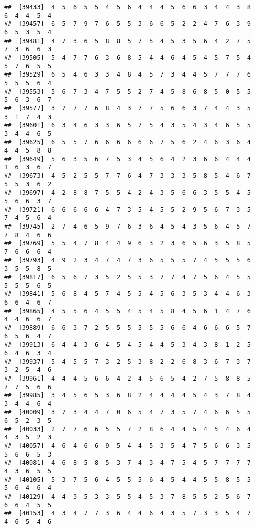 \documentclass[
]{book}
\begin{document}
\begin{verbatim}
##  [39433]  4  5  6  5  5  4  5  6  4  4  4  5  6  6  3  4  4  3  8  6  4  4  5  4
##  [39457]  6  5  7  9  7  6  5  5  3  6  6  5  2  2  4  7  6  3  9  6  5  3  5  4
##  [39481]  4  7  3  6  5  8  8  5  7  5  4  5  3  5  6  4  2  7  5  7  3  6  6  3
##  [39505]  5  4  7  7  6  3  6  8  5  4  4  6  4  5  4  5  7  5  4  5  7  6  5  5
##  [39529]  6  5  4  6  3  3  4  8  4  5  7  3  4  4  5  7  7  7  6  5  5  5  6  4
##  [39553]  5  6  7  3  4  7  5  5  2  7  4  5  8  6  8  5  0  5  5  5  6  3  6  7
##  [39577]  3  7  7  7  6  8  4  3  7  7  5  6  6  3  7  4  4  3  5  3  1  7  4  3
##  [39601]  6  3  4  6  3  3  6  5  7  5  4  3  5  4  3  4  6  5  5  3  4  4  6  5
##  [39625]  6  5  5  7  6  6  6  6  6  6  7  5  6  2  4  6  3  6  4  4  4  5  8  8
##  [39649]  5  6  3  5  6  7  5  3  4  5  6  4  2  3  6  6  4  4  4  1  6  3  6  7
##  [39673]  4  5  2  5  5  7  7  6  4  7  3  3  3  5  8  5  4  6  7  5  5  3  6  2
##  [39697]  4  2  8  8  7  5  5  4  2  4  3  5  6  6  3  5  5  4  5  5  6  6  3  7
##  [39721]  6  6  6  6  6  4  7  3  5  4  5  5  2  9  5  6  7  3  5  7  4  5  6  4
##  [39745]  2  7  4  6  5  9  7  6  3  6  4  5  4  3  5  6  4  5  7  7  8  4  6  6
##  [39769]  5  5  4  7  8  4  4  9  6  3  2  3  6  5  6  3  5  8  5  7  6  6  6  4
##  [39793]  4  9  2  3  4  7  4  7  3  6  5  5  5  7  4  5  5  5  6  3  5  5  8  5
##  [39817]  6  5  6  7  3  5  2  5  5  3  7  7  4  7  5  6  4  5  5  5  5  5  6  5
##  [39841]  5  6  8  4  5  7  4  5  5  4  5  6  3  5  3  4  4  6  3  6  6  4  6  7
##  [39865]  4  5  5  6  4  5  5  4  5  4  5  8  4  5  6  1  4  7  6  4  4  6  6  7
##  [39889]  6  6  3  7  2  5  5  5  5  5  5  6  6  4  6  6  6  5  7  6  5  6  4  7
##  [39913]  6  4  4  3  6  4  5  4  5  4  4  5  3  4  3  8  1  2  5  6  4  6  3  4
##  [39937]  5  4  5  5  7  3  2  5  3  8  2  2  6  8  3  6  7  3  7  3  2  5  4  6
##  [39961]  4  4  4  5  6  6  4  2  4  5  6  5  4  2  7  5  8  8  5  7  7  5  6  6
##  [39985]  3  4  5  6  5  3  6  8  2  4  4  4  4  5  4  3  7  8  4  3  4  4  6  4
##  [40009]  3  7  3  4  4  7  0  6  5  4  7  3  5  7  4  6  6  5  5  6  5  2  3  5
##  [40033]  2  7  7  6  6  5  5  7  2  8  6  4  4  5  4  5  4  6  4  4  3  5  2  3
##  [40057]  4  6  4  6  6  9  5  4  4  5  3  5  4  7  5  6  6  3  5  5  6  6  5  3
##  [40081]  4  6  8  5  8  5  3  7  4  3  4  7  5  4  5  7  7  7  7  4  3  6  5  5
##  [40105]  5  3  7  5  6  4  5  5  5  6  4  5  4  4  5  5  8  5  5  5  6  4  6  4
##  [40129]  4  4  3  5  3  3  5  5  4  5  3  7  8  5  5  2  5  6  7  6  6  4  5  5
##  [40153]  4  3  4  7  7  3  6  4  4  6  4  3  5  7  3  3  5  4  7  4  6  5  4  6

\end{verbatim}
\end{document}
